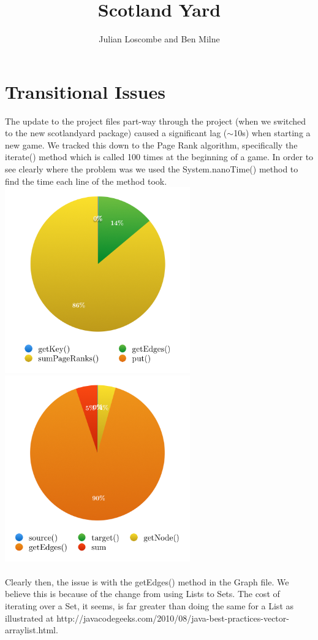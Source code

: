 \documentclass[a4paper, 12pt]{article}
\title{Scotland Yard}
\author{Julian Loscombe and Ben Milne}
\begin{document}
\maketitle
\section{Transitional Issues}
The update to the project files part-way through the project (when we switched to the new scotlandyard package) caused a significant lag ($\sim$10s) when starting a new game. We tracked this down to the Page Rank algorithm, specifically the iterate() method which is called 100 times at the beginning of a game. In order to see clearly where the problem was we used the System.nanoTime() method to find the time each line of the method took.\\
\includegraphics[width = 8cm]{iterate}
\includegraphics[width = 8cm]{sumPageRanks}\\
\\
Clearly then, the issue is with the getEdges() method in the Graph file. We believe this is because of the change from using Lists to Sets. The cost of iterating over a Set, it seems, is far greater than doing the same for a List as illustrated at http://javacodegeeks.com/2010/08/java-best-practices-vector-arraylist.html.\\
\end{document}
